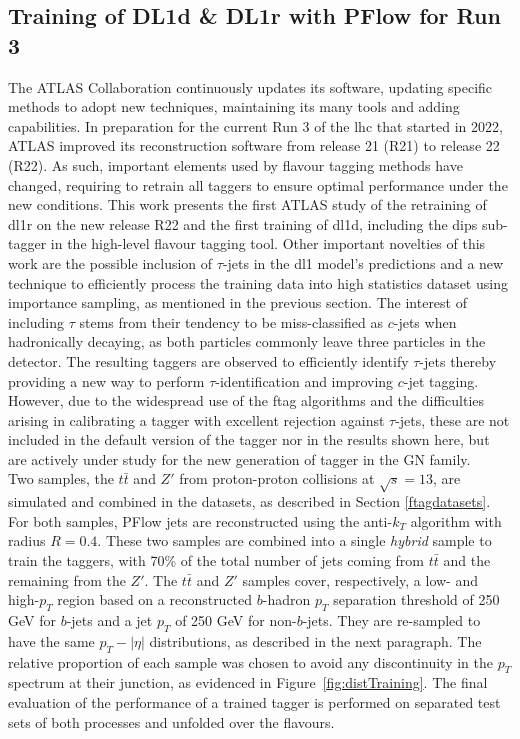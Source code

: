 \subsection{Training of DL1d \& DL1r with PFlow for Run 3}
The ATLAS Collaboration continuously updates its software, updating specific methods to adopt new techniques, maintaining its many tools and adding capabilities. In preparation for the current Run 3 of the \gls{lhc} that started in 2022, ATLAS improved its reconstruction software from release 21 (R21) to release 22 (R22). As such, important elements used by flavour tagging methods have changed, requiring to retrain all taggers to ensure optimal performance under the new conditions. This work presents the first ATLAS study of the retraining of \gls{dl1r} on the new release R22 and the first training of \gls{dl1d}, including the \gls{dips} sub-tagger in the high-level flavour tagging tool. Other important novelties of this work are the possible inclusion of $\tau$-jets in the \gls{dl1} model's predictions and a new technique to efficiently process the training data into high statistics dataset using importance sampling, as mentioned in the previous section. The interest of including $\tau$ stems from their tendency to be miss-classified as $c$-jets when hadronically decaying, as both particles commonly leave three particles in the detector. The resulting taggers are observed to efficiently identify $\tau$-jets thereby providing a new way to perform $\tau$-identification and improving $c$-jet tagging. However, due to the widespread use of the \gls{ftag} algorithms and the difficulties arising in calibrating a tagger with excellent rejection against $\tau$-jets, these are not included in the default version of the tagger nor in the results shown here, but are actively under study for the new generation of tagger in the GN family. \\ %
Two samples, the $t\bar{t}$ and $Z'$ from proton-proton collisions at $\sqrt{s} = 13$, are simulated and combined in the datasets, as described in Section \ref{ftagdatasets}. For both samples, PFlow jets are reconstructed using the anti-$k_T$ algorithm with radius $R = 0.4$. These two samples are combined into a single \textit{hybrid} sample to train the taggers, with 70\% of the total number of jets coming from $t\bar{t}$ and the remaining from the $Z'$. The $t\bar{t}$ and $Z'$ samples cover, respectively, a low- and high-$p_T$ region based on a reconstructed $b$-hadron $p_T$ separation threshold of 250 GeV for $b$-jets and a jet $p_T$ of 250 GeV for non-$b$-jets. They are re-sampled to have the same $p_T-|\eta|$ distributions, as described in the next paragraph. The relative proportion of each sample was chosen to avoid any discontinuity in the $p_T$ spectrum at their junction, as evidenced in Figure~\ref{fig:distTraining}. The final evaluation of the performance of a trained tagger is performed on separated test sets of both processes and unfolded over the flavours.\\

